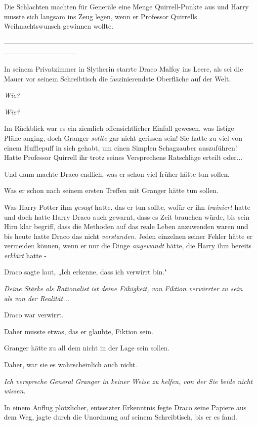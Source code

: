 {Die Schlachten machten für Generäle eine Menge Quirrell-Punkte aus und Harry musste sich langsam ins Zeug legen, wenn er Professor Quirrells Weihnachtswunsch gewinnen wollte.

--------------------------------------------------------------------------------------------------------------------------------------------

\hfill\break In seinem Privatzimmer in Slytherin starrte Draco Malfoy ins Leere, als sei die Mauer vor seinem Schreibtisch die faszinierendste Oberfläche auf der Welt.

\emph{Wie?}

\emph{Wie?}

Im Rückblick war es ein ziemlich offensichtlicher Einfall gewesen, was listige Pläne anging, doch Granger \emph{sollte} gar nicht gerissen sein! Sie hatte zu viel von einem Hufflepuff in sich gehabt, um einen Simplen Schagzauber auszuführen! Hatte Professor Quirrell ihr trotz seines Versprechens Ratschläge erteilt oder...

Und dann machte Draco endlich, was er schon viel früher hätte tun sollen.

Was er schon nach seinem ersten Treffen mit Granger hätte tun sollen.

Was Harry Potter ihm \emph{gesagt} hatte, das er tun sollte, wofür er ihn \emph{trainiert} hatte und doch hatte Harry Draco auch gewarnt, dass es Zeit brauchen würde, bis sein Hirn klar begriff, dass die Methoden auf das reale Leben anzuwenden waren und bis heute hatte Draco das nicht \emph{verstanden.} Jeden einzelnen seiner Fehler hätte er vermeiden können, wenn er nur die Dinge \emph{angewandt} hätte, die Harry ihm bereits \emph{erklärt} hatte -

Draco sagte laut, „Ich erkenne, dass ich verwirrt bin."

\emph{Deine Stärke als Rationalist ist deine Fähigkeit, von Fiktion verwirrter zu sein als von der Realität...}

Draco war verwirrt.

Daher musste etwas, das er glaubte, Fiktion sein.

Granger hätte zu all dem nicht in der Lage sein sollen.

Daher, war sie es wahrscheinlich auch nicht.

\emph{Ich verspreche General Granger in keiner Weise zu helfen, von der Sie beide nicht wissen.}

In einem Anflug plötzlicher, entsetzter Erkenntnis fegte Draco seine Papiere aus dem Weg, jagte durch die Unordnung auf seinem Schreibtisch, bis er es fand.

}
